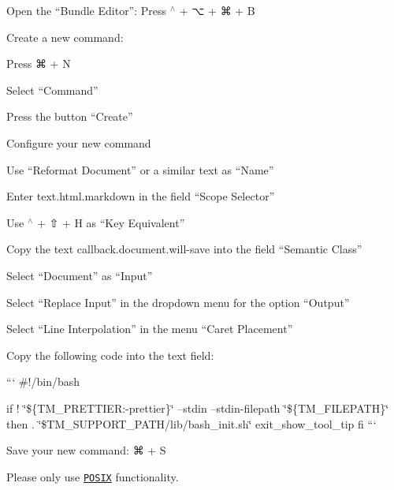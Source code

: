 \begin{DoxyEnumerate}
\item Open the “\+Bundle Editor”\+: Press {\ttfamily $^\wedge$} + {\ttfamily ⌥} + {\ttfamily ⌘} + {\ttfamily B}
\item Create a new command\+:
\begin{DoxyEnumerate}
\item Press {\ttfamily ⌘} + {\ttfamily N}
\item Select “\+Command”
\item Press the button “\+Create”
\end{DoxyEnumerate}
\item Configure your new command
\begin{DoxyEnumerate}
\item Use “\+Reformat Document” or a similar text as “\+Name”
\item Enter {\ttfamily text.\+html.\+markdown} in the field “\+Scope Selector”
\item Use {\ttfamily $^\wedge$} + {\ttfamily ⇧} + {\ttfamily H} as “\+Key Equivalent”
\item Copy the text {\ttfamily callback.\+document.\+will-\/save} into the field “\+Semantic Class”
\item Select “\+Document” as “\+Input”
\item Select “\+Replace Input” in the dropdown menu for the option “\+Output”
\item Select “\+Line Interpolation” in the menu “\+Caret Placement”
\item Copy the following code into the text field\+:

``` \#!/bin/bash

if ! \char`\"{}\$\{\+T\+M\+\_\+\+P\+R\+E\+T\+T\+I\+E\+R\+:-\/prettier\}\char`\"{} --stdin --stdin-\/filepath \char`\"{}\$\{\+T\+M\+\_\+\+F\+I\+L\+E\+P\+A\+T\+H\}\char`\"{} then . \char`\"{}\$\+T\+M\+\_\+\+S\+U\+P\+P\+O\+R\+T\+\_\+\+P\+A\+T\+H/lib/bash\+\_\+init.\+sh\char`\"{} exit\+\_\+show\+\_\+tool\+\_\+tip fi ```
\item Save your new command\+: {\ttfamily ⌘} + {\ttfamily S}
\end{DoxyEnumerate}
\end{DoxyEnumerate}


\begin{DoxyItemize}
\item Please only use \href{https://en.wikipedia.org/wiki/POSIX}{\tt P\+O\+S\+IX} functionality.
\end{DoxyItemize}

